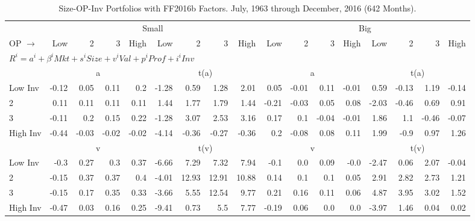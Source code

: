 
\begin{table}[!ht]
\centering
\caption{Size-OP-Inv Portfolios with FF2016b Factors. \footnotesize{July, 1963 through December, 2016 (642 Months).}}
\begin{tabular}{lrrrrrrrrrrrrrrrr}
  \toprule
    & \multicolumn{8}{c}{Small} & \multicolumn{8}{c}{Big} \\
      \cmidrule(r){2-9} \cmidrule(r){10-17}
    OP $\rightarrow$ & Low & 2 & 3 & High & Low & 2 & 3 & High & Low & 2 & 3 & High & Low & 2 & 3 & High \\ 
  \midrule
  \multicolumn{9}{l}{$R^i=a^i+\beta^iMkt+s^iSize+v^iVal+p^iProf+i^iInv$} \\

  
    
      & \multicolumn{4}{c}{a} & \multicolumn{4}{c}{t(a)}
    
      & \multicolumn{4}{c}{a} & \multicolumn{4}{c}{t(a)}
    
    \\
      \cmidrule(r){2-5} \cmidrule(r){6-9} \cmidrule(r){10-13} \cmidrule(r){14-17}

    Low Inv   & -0.12  & 0.05  & 0.11  & 0.2  & -1.28  & 0.59  & 1.28  & 2.01  & 0.05  & -0.01  & 0.11  & -0.01  & 0.59  & -0.13  & 1.19  & -0.14  \\
           2  & 0.11  & 0.11  & 0.11  & 0.11  & 1.44  & 1.77  & 1.79  & 1.44  & -0.21  & -0.03  & 0.05  & 0.08  & -2.03  & -0.46  & 0.69  & 0.91  \\
           3  & -0.11  & 0.2  & 0.15  & 0.22  & -1.28  & 3.07  & 2.53  & 3.16  & 0.17  & 0.1  & -0.04  & -0.01  & 1.86  & 1.1  & -0.46  & -0.07  \\
    High Inv  & -0.44  & -0.03  & -0.02  & -0.02  & -4.14  & -0.36  & -0.27  & -0.36  & 0.2  & -0.08  & 0.08  & 0.11  & 1.99  & -0.9  & 0.97  & 1.26  \\

  
    
      & \multicolumn{4}{c}{v} & \multicolumn{4}{c}{t(v)}
    
      & \multicolumn{4}{c}{v} & \multicolumn{4}{c}{t(v)}
    
    \\
      \cmidrule(r){2-5} \cmidrule(r){6-9} \cmidrule(r){10-13} \cmidrule(r){14-17}

    Low Inv   & -0.3  & 0.27  & 0.3  & 0.37  & -6.66  & 7.29  & 7.32  & 7.94  & -0.1  & 0.0  & 0.09  & -0.0  & -2.47  & 0.06  & 2.07  & -0.04  \\
           2  & -0.15  & 0.37  & 0.37  & 0.4  & -4.01  & 12.93  & 12.91  & 10.88  & 0.14  & 0.1  & 0.1  & 0.05  & 2.91  & 2.82  & 2.73  & 1.21  \\
           3  & -0.15  & 0.17  & 0.35  & 0.33  & -3.66  & 5.55  & 12.54  & 9.77  & 0.21  & 0.16  & 0.11  & 0.06  & 4.87  & 3.95  & 3.02  & 1.52  \\
    High Inv  & -0.47  & 0.03  & 0.16  & 0.25  & -9.41  & 0.73  & 5.5  & 7.77  & -0.19  & 0.06  & 0.0  & 0.0  & -3.97  & 1.46  & 0.04  & 0.02  \\


\end{tabular}
\end{table}
